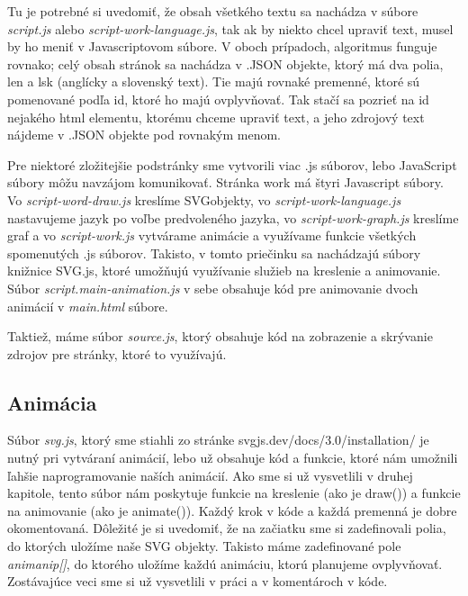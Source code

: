 Tu je potrebné si uvedomiť, že obsah všetkého textu sa nachádza v súbore \textit{script.js} alebo \textit{script-work-language.js}, tak ak by niekto chcel upraviť text, musel by ho meniť v Javascriptovom súbore. V oboch prípadoch, algoritmus funguje rovnako; celý obsah stránok sa nachádza v .JSON objekte, ktorý má dva polia, len a lsk (anglícky a slovenský text). Tie majú rovnaké premenné, ktoré sú pomenované podľa id, ktoré ho majú ovplyvňovať. Tak stačí sa pozrieť na id nejakého html elementu, ktorému chceme upraviť text, a jeho zdrojový text nájdeme v .JSON objekte pod rovnakým menom. 

Pre niektoré zložitejšie podstránky sme vytvorili viac .js súborov, lebo JavaScript súbory môžu navzájom komunikovať.  Stránka work má štyri Javascript súbory. Vo \textit{script-word-draw.js} kreslíme \acrshort{SVG}objekty, vo \textit{script-work-language.js} nastavujeme jazyk po voľbe predvoleného jazyka, vo \textit{script-work-graph.js} kreslíme graf a vo \textit{script-work.js} vytvárame animácie a využívame funkcie všetkých spomenutých .js súborov. Takisto, v tomto priečinku sa nachádzajú súbory knižnice SVG.js, ktoré umožňujú využívanie služieb na kreslenie a animovanie. Súbor \textit{script.main-animation.js} v sebe obsahuje kód pre animovanie dvoch animácií v \textit{main.html} súbore. 

Taktiež, máme súbor \textit{source.js}, ktorý obsahuje kód na zobrazenie a skrývanie zdrojov pre  stránky, ktoré to využívajú.

\subsection{Animácia}
\noindent Súbor \textit{svg.js}, ktorý sme stiahli zo stránke svgjs.dev/docs/3.0/installation/ je nutný pri vytváraní animácií, lebo už obsahuje kód a funkcie, ktoré nám umožnili ľahšie naprogramovanie naších animácií. Ako sme si už vysvetlili v druhej kapitole, tento súbor nám poskytuje funkcie na kreslenie (ako je draw()) a funkcie na animovanie (ako je animate()). 
Každý krok v kóde a každá premenná je dobre okomentovaná. Dôležité je si uvedomiť, že na začiatku sme si zadefinovali polia, do ktorých uložíme naše SVG objekty. Takisto máme zadefinované pole \textit{animanip[]}, do ktorého uložíme každú animáciu, ktorú planujeme ovplyvňovať. Zostávajúce veci sme si už vysvetlili v práci a v komentároch v kóde.